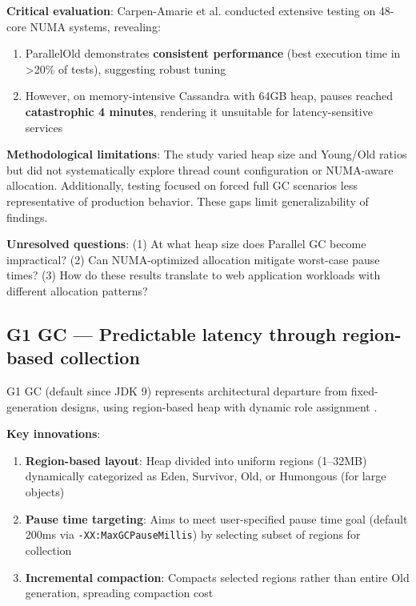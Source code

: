 \textbf{Critical evaluation}: Carpen-Amarie et al. \cite{carpen2015performance} conducted extensive testing on 48-core NUMA systems, revealing:

\begin{enumerate}
    \item ParallelOld demonstrates \textbf{consistent performance} (best execution time in >20\% of tests), suggesting robust tuning
    \item However, on memory-intensive Cassandra with 64GB heap, pauses reached \textbf{catastrophic 4 minutes}, rendering it unsuitable for latency-sensitive services
\end{enumerate}

\textbf{Methodological limitations}: The study varied heap size and Young/Old ratios but did not systematically explore thread count configuration or NUMA-aware allocation. Additionally, testing focused on forced full GC scenarios less representative of production behavior. These gaps limit generalizability of findings.

\textbf{Unresolved questions}: (1) At what heap size does Parallel GC become impractical? (2) Can NUMA-optimized allocation mitigate worst-case pause times? (3) How do these results translate to web application workloads with different allocation patterns?

\subsection{G1 GC --- Predictable latency through region-based collection}
\label{subsec:g1-gc}

G1 GC (default since JDK 9) represents architectural departure from fixed-generation designs, using region-based heap with dynamic role assignment \cite{detlefs2004garbage, oracle2023gc, jep307}.

\textbf{Key innovations}:
\begin{enumerate}
    \item \textbf{Region-based layout}: Heap divided into uniform regions (1--32MB) dynamically categorized as Eden, Survivor, Old, or Humongous (for large objects)
    \item \textbf{Pause time targeting}: Aims to meet user-specified pause time goal (default 200ms via \texttt{-XX:MaxGCPauseMillis}) by selecting subset of regions for collection
    \item \textbf{Incremental compaction}: Compacts selected regions rather than entire Old generation, spreading compaction cost
\end{enumerate}

